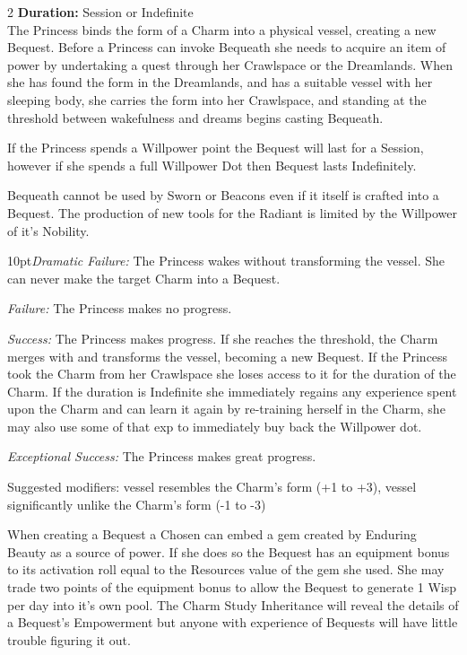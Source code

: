 \begin{multicols}{2}
\noindent \textbf{Duration:} Session or Indefinite \\

\noindent The Princess binds the form of a Charm into a physical vessel, creating a new Bequest. Before a Princess can invoke Bequeath she needs to acquire an item of power by undertaking a quest through her Crawlspace or the Dreamlands. When she has found the form in the Dreamlands, and has a suitable vessel with her sleeping body, she carries the form into her Crawlspace, and standing at the threshold between wakefulness and dreams begins casting Bequeath.

If the Princess spends a Willpower point the Bequest will last for a Session, however if she spends a full Willpower Dot then Bequest lasts Indefinitely. 

Bequeath cannot be used by Sworn or Beacons even if it itself is crafted into a Bequest. The production of new tools for the Radiant is limited by the Willpower of it's Nobility. 

    \begin{myindentpar}{10pt}\emph{Dramatic Failure:} The Princess wakes without transforming the vessel. She can never make the target Charm into a Bequest.

    \emph{Failure:} The Princess makes no progress.

    \emph{Success:} The Princess makes progress. If she reaches the threshold, the Charm merges with and transforms the vessel, becoming a new Bequest. If the Princess took the Charm from her Crawlspace she loses access to it for the duration of the Charm. If the duration is Indefinite she immediately regains any experience spent upon the Charm and can learn it again by re-training herself in the Charm, she may also use some of that exp to immediately buy back the Willpower dot.

    \emph{Exceptional Success:} The Princess makes great progress.

Suggested modifiers: vessel resembles the Charm's form (+1 to +3), vessel significantly unlike the Charm's form (-1 to -3)\end{myindentpar} 

When creating a Bequest a Chosen can embed a gem created by Enduring Beauty as a source of power. If she does so the Bequest has an equipment bonus to its activation roll equal to the Resources value of the gem she used. She may trade two points of the equipment bonus to allow the Bequest to generate 1 Wisp per day into it's own pool. The Charm Study Inheritance will reveal the details of a Bequest's Empowerment but anyone with experience of Bequests will have little trouble figuring it out.


\end{multicols}
